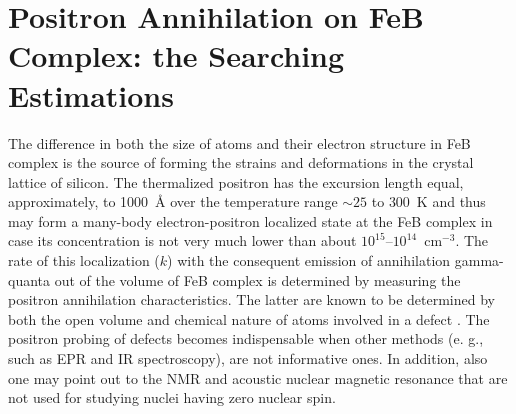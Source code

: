 \documentclass{ttp}
\begin{document}
\section{Positron Annihilation on FeB Complex: the Searching Estimations}

The difference in both the size of atoms and their electron structure in FeB complex
is the source of forming the strains and deformations in the crystal lattice of silicon.
The thermalized positron has the excursion length \cite{Krause1999} equal,
approximately, to 1000~{\AA} over the temperature range $\sim25$ to $300$~K
and thus may form a many-body electron-positron localized state at the
FeB complex in case its concentration is not very much lower than about $10^{15} – 10^{14}$~cm$^{−3}$.
The rate of this localization ($k$) with the consequent emission of annihilation
gamma-quanta out of the volume of FeB complex is determined by measuring the positron annihilation characteristics.
The latter are known to be determined by both the open volume and chemical nature of atoms involved in a defect \cite{Krause1999}.
The positron probing of defects becomes indispensable when other methods
(e. g., such as EPR and IR spectroscopy), are not informative ones.
In addition, also one may point out to the NMR and acoustic nuclear magnetic resonance
that are not used for studying nuclei having zero nuclear spin.
\end{document}
